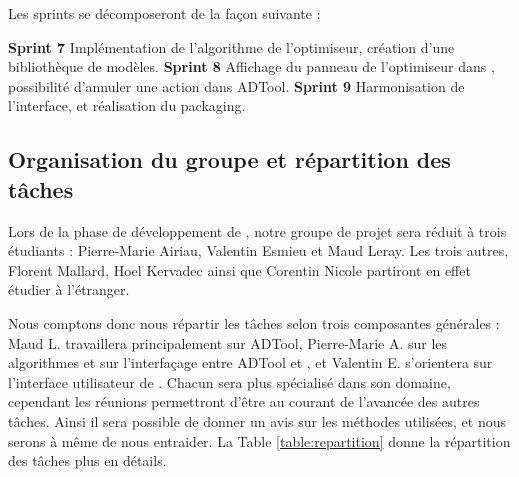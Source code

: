             Les sprints se décomposeront de la façon suivante :

            \noindent\textbf{Sprint 7} Implémentation de l'algorithme de l'optimiseur, création d'une bibliothèque de modèles.\newline
            \textbf{Sprint 8} Affichage du panneau de l'optimiseur dans \glasir{}, possibilité d'annuler une action dans ADTool.\newline
            \textbf{Sprint 9} Harmonisation de l'interface, et réalisation du packaging. \newline



    
    
    \subsection{Organisation du groupe et répartition des tâches}
        Lors de la phase de développement de \glasir{}, notre groupe de projet sera réduit à trois étudiants : Pierre-Marie {\sc Airiau}, Valentin {\sc Esmieu} et Maud {\sc Leray}. Les trois autres, Florent {\sc Mallard}, Hoel {\sc Kervadec} ainsi que Corentin {\sc Nicole} partiront en effet étudier à l'étranger.
        
        Nous comptons donc nous répartir les tâches selon trois composantes générales : Maud L. travaillera principalement sur ADTool, Pierre-Marie A. sur les algorithmes et sur l'interfaçage entre ADTool et \glasir{}, et Valentin E. s'orientera sur l'interface utilisateur de \glasir{}. Chacun sera plus spécialisé dans son domaine, cependant les réunions permettront d'être au courant de l'avancée des autres tâches. Ainsi il sera possible de donner un avis sur les méthodes utilisées, et nous serons à même de nous entraider. La {\sc Table} \ref{table:repartition} donne la répartition des tâches plus en détails.

